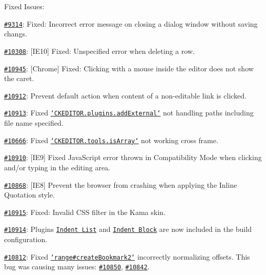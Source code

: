 Fixed Issues\-:
\begin{DoxyItemize}
\item \href{http://dev.ckeditor.com/ticket/9314}{\tt \#9314}\-: Fixed\-: Incorrect error message on closing a dialog window without saving changs.
\item \href{http://dev.ckeditor.com/ticket/10308}{\tt \#10308}\-: \mbox{[}I\-E10\mbox{]} Fixed\-: Unspecified error when deleting a row.
\item \href{http://dev.ckeditor.com/ticket/10945}{\tt \#10945}\-: \mbox{[}Chrome\mbox{]} Fixed\-: Clicking with a mouse inside the editor does not show the caret.
\item \href{http://dev.ckeditor.com/ticket/10912}{\tt \#10912}\-: Prevent default action when content of a non-\/editable link is clicked.
\item \href{http://dev.ckeditor.com/ticket/10913}{\tt \#10913}\-: Fixed \href{http://docs.ckeditor.com/#!/api/CKEDITOR.resourceManager-method-addExternal}{\tt `\-C\-K\-E\-D\-I\-T\-O\-R.plugins.\-add\-External`} not handling paths including file name specified.
\item \href{http://dev.ckeditor.com/ticket/10666}{\tt \#10666}\-: Fixed \href{http://docs.ckeditor.com/#!/api/CKEDITOR.tools-method-isArray}{\tt `\-C\-K\-E\-D\-I\-T\-O\-R.tools.\-is\-Array`} not working cross frame.
\item \href{http://dev.ckeditor.com/ticket/10910}{\tt \#10910}\-: \mbox{[}I\-E9\mbox{]} Fixed Java\-Script error thrown in Compatibility Mode when clicking and/or typing in the editing area.
\item \href{http://dev.ckeditor.com/ticket/10868}{\tt \#10868}\-: \mbox{[}I\-E8\mbox{]} Prevent the browser from crashing when applying the Inline Quotation style.
\item \href{http://dev.ckeditor.com/ticket/10915}{\tt \#10915}\-: Fixed\-: Invalid C\-S\-S filter in the Kama skin.
\item \href{http://dev.ckeditor.com/ticket/10914}{\tt \#10914}\-: Plugins \href{http://ckeditor.com/addon/indentlist}{\tt Indent List} and \href{http://ckeditor.com/addon/indentblock}{\tt Indent Block} are now included in the build configuration.
\item \href{http://dev.ckeditor.com/ticket/10812}{\tt \#10812}\-: Fixed \href{http://docs.ckeditor.com/#!/api/CKEDITOR.dom.range-method-createBookmark2}{\tt `range\#create\-Bookmark2`} incorrectly normalizing offsets. This bug was causing many issues\-: \href{http://dev.ckeditor.com/ticket/10850}{\tt \#10850}, \href{http://dev.ckeditor.com/ticket/10842}{\tt \#10842}.

\end{DoxyItemize}
